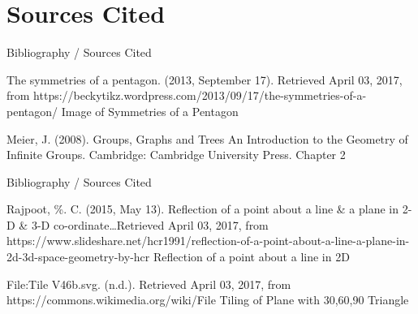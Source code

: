 \documentclass[usenames,dvipsnames]{beamer}
\begin{document}

\section{Sources Cited}

\begin{frame}{Bibliography / Sources Cited}

\begin{thebibliography}{9}

The symmetries of a pentagon. (2013, September 17). Retrieved April 03, 2017, from
https://beckytikz.wordpress.com/2013/09/17/the-symmetries-of-a-pentagon/
Image of Symmetries of a Pentagon

Meier, J. (2008). Groups, Graphs and Trees An Introduction to the Geometry of Infinite Groups. Cambridge:
Cambridge University Press.
Chapter 2

\end{thebibliography}

\end{frame}

\begin{frame}{Bibliography / Sources Cited}

\begin{thebibliography}{9}

Rajpoot, \%. C. (2015, May 13). Reflection of a point about a line \& a plane in 2-D \& 3-D
co-ordinate\ldots Retrieved April 03, 2017, from
https://www.slideshare.net/hcr1991/reflection-of-a-point-about-a-line-a-plane-in-2d-3d-space-geometry-by-hcr
Reflection of a point about a line in 2D

File:Tile V46b.svg. (n.d.). Retrieved April 03, 2017, from
https://commons.wikimedia.org/wiki/File%
Tiling of Plane with 30,60,90 Triangle

\end{thebibliography}

\end{frame}
\end{document}
